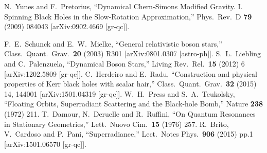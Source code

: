 \documentclass{article}
\numberwithin{equation}{section}
\begin{document}
\begin{small}
\begin{thebibliography}{99}
  N.~Yunes and F.~Pretorius,
  ``Dynamical Chern-Simons Modified Gravity. I. Spinning Black Holes in the Slow-Rotation Approximation,''
  Phys.\ Rev.\ D {\bf 79} (2009) 084043
  [arXiv:0902.4669 [gr-qc]].
 
  F.~E.~Schunck and E.~W.~Mielke,
  ``General relativistic boson stars,''
  Class.\ Quant.\ Grav.\  {\bf 20} (2003) R301
  [arXiv:0801.0307 [astro-ph]].
  S.~L.~Liebling and C.~Palenzuela,
  ``Dynamical Boson Stars,''
  Living Rev.\ Rel.\  {\bf 15} (2012) 6
  [arXiv:1202.5809 [gr-qc]].
  C.~Herdeiro and E.~Radu,
  ``Construction and physical properties of Kerr black holes with scalar hair,''
  Class.\ Quant.\ Grav.\  {\bf 32} (2015) 14,  144001
  [arXiv:1501.04319 [gr-qc]].
  W.~H.~Press and S.~A.~Teukolsky,
  ``Floating Orbits, Superradiant Scattering and the Black-hole Bomb,''
  Nature {\bf 238} (1972) 211.
  T.~Damour, N.~Deruelle and R.~Ruffini,
  ``On Quantum Resonances in Stationary Geometries,''
  Lett.\ Nuovo Cim.\  {\bf 15} (1976) 257.
  R.~Brito, V.~Cardoso and P.~Pani,
  ``Superradiance,''
  Lect.\ Notes Phys.\  {\bf 906} (2015) pp.1
  [arXiv:1501.06570 [gr-qc]].
  

\end{thebibliography}
\end{small}
\end{document}
